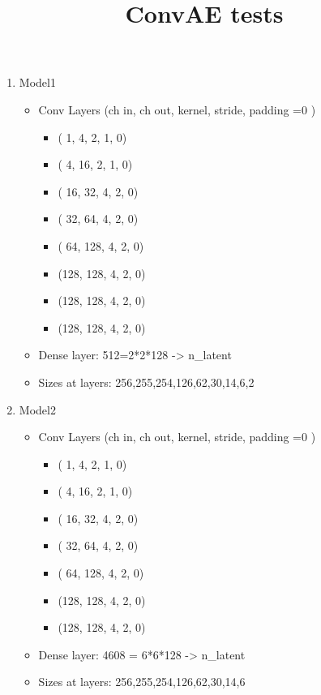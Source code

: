 \documentclass[USenglish]{article}
\newcommand{\1}{\begin{pmatrix}
		1\\
		1
\end{pmatrix}}
\begin{document}
	\title{ConvAE tests} 

\begin{enumerate}
	\item Model1
	\begin{itemize}
		\item Conv Layers (ch in, ch out, kernel, stride, padding =0 )
		\begin{itemize}
			\item (  1,   4, 2, 1, 0)
			\item (  4,  16, 2, 1, 0)
			\item ( 16,  32, 4, 2, 0)
			\item ( 32,  64, 4, 2, 0)
			\item ( 64, 128, 4, 2, 0)
			\item (128, 128, 4, 2, 0)
			\item (128, 128, 4, 2, 0)
			\item (128, 128, 4, 2, 0)
		\end{itemize}
		\item Dense layer: 512=2*2*128 -> n\_latent
		\item Sizes at layers: 256,255,254,126,62,30,14,6,2
	\end{itemize}
	\item Model2
	\begin{itemize}
		\item Conv Layers (ch in, ch out, kernel, stride, padding =0 )
		\begin{itemize}
			\item (  1,   4, 2, 1, 0)
			\item (  4,  16, 2, 1, 0)
			\item ( 16,  32, 4, 2, 0)
			\item ( 32,  64, 4, 2, 0)
			\item ( 64, 128, 4, 2, 0)
			\item (128, 128, 4, 2, 0)
			\item (128, 128, 4, 2, 0)
		\end{itemize}
		\item Dense layer: 4608 = 6*6*128 -> n\_latent
		\item Sizes at layers: 256,255,254,126,62,30,14,6
	\end{itemize}
	
\end{enumerate}
\end{document}
